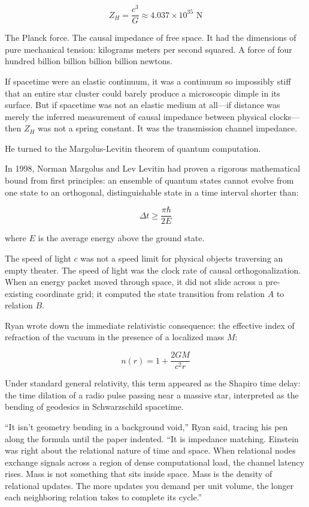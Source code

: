 \documentclass[12pt,twoside,openright]{book}
\begin{document}
\[Z_H = \frac{c^3}{G} \approx 4.037 \times 10^{35} \text{ N}\]

The Planck force. The causal impedance of free space. It had the
dimensions of pure mechanical tension: kilograms meters per second
squared. A force of four hundred billion billion billion billion
newtons.

If spacetime were an elastic continuum, it was a continuum so impossibly
stiff that an entire star cluster could barely produce a microscopic
dimple in its surface. But if spacetime was not an elastic medium at
all---if distance was merely the inferred measurement of causal
impedance between physical clocks---then \(Z_H\) was not a spring
constant. It was the transmission channel impedance.

He turned to the Margolus-Levitin theorem of quantum computation.

In 1998, Norman Margolus and Lev Levitin had proven a rigorous
mathematical bound from first principles: an ensemble of quantum states
cannot evolve from one state to an orthogonal, distinguishable state in
a time interval shorter than:

\[\Delta t \ge \frac{\pi \hbar}{2 E}\]

where \(E\) is the average energy above the ground state.

The speed of light \(c\) was not a speed limit for physical objects
traversing an empty theater. The speed of light was the clock rate of
causal orthogonalization. When an energy packet moved through space, it
did not slide across a pre-existing coordinate grid; it computed the
state transition from relation \(A\) to relation \(B\).

Ryan wrote down the immediate relativistic consequence: the effective
index of refraction of the vacuum in the presence of a localized mass
\(M\):

\[n(r) = 1 + \frac{2GM}{c^2 r}\]

Under standard general relativity, this term appeared as the Shapiro
time delay: the time dilation of a radio pulse passing near a massive
star, interpreted as the bending of geodesics in Schwarzschild
spacetime.

``It isn't geometry bending in a background void,'' Ryan said, tracing
his pen along the formula until the paper indented. ``It is impedance
matching. Einstein was right about the relational nature of time and
space. When relational nodes exchange signals across a region of dense
computational load, the channel latency rises. Mass is not something
that sits inside space. Mass is the density of relational updates. The
more updates you demand per unit volume, the longer each neighboring
relation takes to complete its cycle.''
\end{document}
